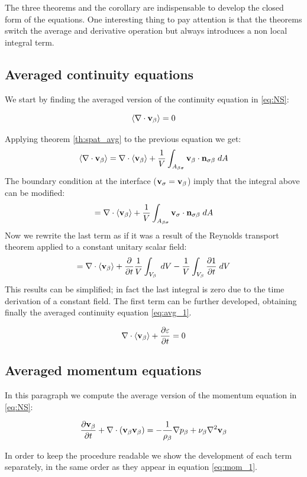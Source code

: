 The three theorems and the corollary are indispensable to develop the closed form of the equations.
One interesting thing to pay attention is that the theorems switch the average and derivative operation but always introduces a non local integral term.

\subsection{Averaged continuity equations}
We start by finding the averaged version of the continuity equation in \eqref{eq:NS}:

\begin{equation}
{\left< \nabla \cdot \textbf{v}_{\beta}\right>}   = 0
\label{eq:superf_avg_cont}
\end{equation}

Applying theorem \eqref{th:spat_avg} to the previous equation we get:
$$
{\left< \nabla \cdot \textbf{v}_{\beta} \right>} = \nabla \cdot {\left< \textbf{v}_{\beta}\right>} + \dfrac{1}{V} \int_{A_{\beta \sigma}}  \textbf{v}_{\beta} \cdot \mathbf{n}_{\sigma \beta} \;dA
$$
The boundary condition at the interface ($\textbf{v}_{\sigma} = \textbf{v}_{\beta}$) imply that the integral above can be modified: 
$$=\nabla \cdot {\left< \textbf{v}_{\beta}\right>} + \dfrac{1}{V} \int_{A_{\beta \sigma}}  \textbf{v}_{\sigma} \cdot \mathbf{n}_{\sigma \beta} \;dA$$
Now we rewrite the last term as if it was a result of the Reynolds transport theorem applied to a constant unitary scalar field:
$$=\nabla \cdot {\left< \textbf{v}_{\beta}\right>} + \dfrac{\partial }{\partial t} \dfrac{1}{V} \int_{V_\beta} \;dV  - \dfrac{1}{V} \int_{V_\beta} \dfrac{\partial 1}{\partial t} \;dV $$
This results can be simplified; in fact the last integral is zero due to the time derivation of a constant field. The first term can be further developed, obtaining finally the averaged continuity equation \eqref{eq:avg_1}.

\begin{equation}
\nabla \cdot {\left< \textbf{v}_{\beta}\right>} + \dfrac{\partial \varepsilon}{\partial t} =0
\label{eq:avg_1}
\end{equation}


\subsection{Averaged momentum equations}
In this paragraph we compute the average version of the momentum equation in \eqref{eq:NS}:

\begin{equation}
\dfrac{\partial \textbf{v}_{\beta}}{\partial t} + \nabla \cdot (\textbf{v}_{\beta}\textbf{v}_{\beta}) = -\frac{1}{\rho_{\beta}} \nabla p_{\beta} + \nu_{\beta} \nabla^2  \textbf{v}_{\beta}
\label{eq:mom_1}
\end{equation}

In order to keep the procedure readable we show the development of each term separately, in the same order as they appear in equation \eqref{eq:mom_1}.

